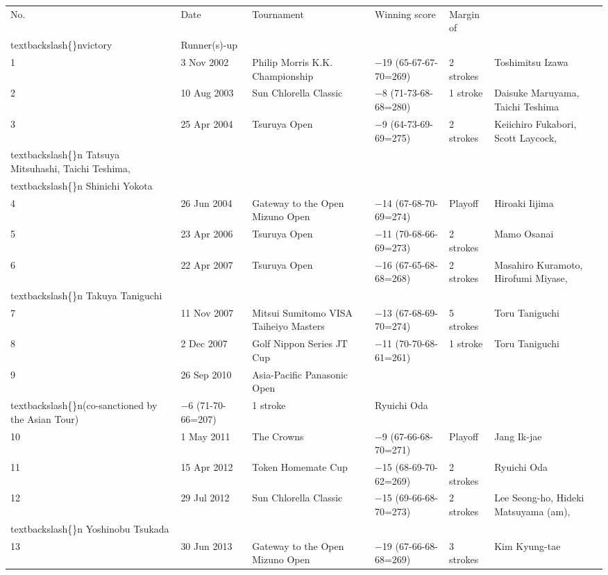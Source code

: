 \documentclass{article}
\begin{document}
\begin{tabular}{llllll}
\toprule
No. & Date & Tournament & Winning score & Margin of\\textbackslash\{\}nvictory & Runner(s)-up \\
\midrule
1 & 3 Nov 2002 & Philip Morris K.K. Championship & −19 (65-67-67-70=269) & 2 strokes & Toshimitsu Izawa \\
2 & 10 Aug 2003 & Sun Chlorella Classic & −8 (71-73-68-68=280) & 1 stroke & Daisuke Maruyama, Taichi Teshima \\
3 & 25 Apr 2004 & Tsuruya Open & −9 (64-73-69-69=275) & 2 strokes & Keiichiro Fukabori, Scott Laycock,\\textbackslash\{\}n Tatsuya Mitsuhashi, Taichi Teshima,\\textbackslash\{\}n Shinichi Yokota \\
4 & 26 Jun 2004 & Gateway to the Open Mizuno Open & −14 (67-68-70-69=274) & Playoff & Hiroaki Iijima \\
5 & 23 Apr 2006 & Tsuruya Open & −11 (70-68-66-69=273) & 2 strokes & Mamo Osanai \\
6 & 22 Apr 2007 & Tsuruya Open & −16 (67-65-68-68=268) & 2 strokes & Masahiro Kuramoto, Hirofumi Miyase,\\textbackslash\{\}n Takuya Taniguchi \\
7 & 11 Nov 2007 & Mitsui Sumitomo VISA Taiheiyo Masters & −13 (67-68-69-70=274) & 5 strokes & Toru Taniguchi \\
8 & 2 Dec 2007 & Golf Nippon Series JT Cup & −11 (70-70-68-61=261) & 1 stroke & Toru Taniguchi \\
9 & 26 Sep 2010 & Asia-Pacific Panasonic Open\\textbackslash\{\}n(co-sanctioned by the Asian Tour) & −6 (71-70-66=207) & 1 stroke & Ryuichi Oda \\
10 & 1 May 2011 & The Crowns & −9 (67-66-68-70=271) & Playoff & Jang Ik-jae \\
11 & 15 Apr 2012 & Token Homemate Cup & −15 (68-69-70-62=269) & 2 strokes & Ryuichi Oda \\
12 & 29 Jul 2012 & Sun Chlorella Classic & −15 (69-66-68-70=273) & 2 strokes & Lee Seong-ho, Hideki Matsuyama (am),\\textbackslash\{\}n Yoshinobu Tsukada \\
13 & 30 Jun 2013 & Gateway to the Open Mizuno Open & −19 (67-66-68-68=269) & 3 strokes & Kim Kyung-tae \\
\bottomrule
\end{tabular}
\end{document}
